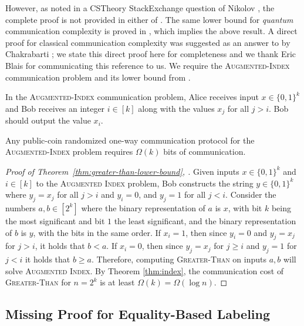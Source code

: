 \documentclass{theoretics}
\newcommand{\zo}{\{0,1\}}
\begin{document}
However, as noted in a CSTheory StackExchange question of Nikolov \cite{Nik20}, the complete proof
is not provided in either of \cite{KNR99,MNSW98}. The same lower bound for \emph{quantum}
communication complexity is proved in \cite{ATYY17}, which implies the above result.  A direct proof
for classical communication complexity was suggested as an answer to \cite{Nik20} by Chakrabarti
\cite{Chak20}; we state this direct proof here for completeness and we thank Eric Blais for
communicating this reference to us. We require the \textsc{Augmented-Index} communication problem
and its lower bound from \cite{MNSW98}.

\begin{definition}
In the \textsc{Augmented-Index} communication problem, Alice receives input $x \in \zo^k$ and Bob
receives an integer $i \in [k]$ along with the values $x_j$ for all $j > i$. Bob should output the
value $x_i$.
\end{definition}

\begin{theorem}
\label{thm:index}
Any public-coin randomized one-way communication protocol for the \textsc{Augmented-Index} problem requires
$\Omega(k)$ bits of communication.
\end{theorem}

\begin{proof}[{Proof of Theorem~\ref{thm:greater-than-lower-bound}, \cite{Chak20}}]
Given inputs $x \in \zo^k$ and $i \in [k]$ to the \textsc{Augmented Index} problem, Bob constructs
the string $y \in \zo^k$ where $y_j = x_j$ for all $j > i$ and $y_i = 0$, and $y_j = 1$ for all $j
< i$.  Consider the numbers $a,b \in [2^k]$ where the binary representation of $a$ is $x$, with
bit $k$ being the most significant and bit $1$ the least significant, and the binary representation
of $b$ is $y$, with the bits in the same order. If $x_i = 1$, then since $y_i = 0$ and $y_j = x_j$
for $j > i$, it holds that $b < a$. If $x_i = 0$, then since $y_j = x_j$ for $j \geq i$ and $y_j =
1$ for $j < i$ it holds that $b \geq a$. Therefore, computing \textsc{Greater-Than} on inputs $a,b$
will solve \textsc{Augmented Index}. By Theorem \ref{thm:index}, the communication cost of
\textsc{Greater-Than} for $n = 2^k$ is at least $\Omega(k) = \Omega(\log n)$.
\end{proof}

\subsection{Missing Proof for Equality-Based Labeling}
\label{section:eq-labeling-proof}
\end{document}
